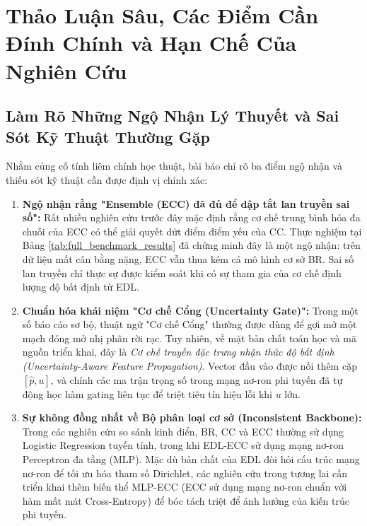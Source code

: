 \documentclass[1p,times]{elsarticle}
\begin{document}
\section{Thảo Luận Sâu, Các Điểm Cần Đính Chính và Hạn Chế Của Nghiên Cứu}
\label{sec:discussion}

\subsection{Làm Rõ Những Ngộ Nhận Lý Thuyết và Sai Sót Kỹ Thuật Thường Gặp}
Nhằm củng cố tính liêm chính học thuật, bài báo chỉ rõ ba điểm ngộ nhận và thiếu sót kỹ thuật cần được định vị chính xác:
\begin{enumerate}
    \item \textbf{Ngộ nhận rằng "Ensemble (ECC) đã đủ để dập tắt lan truyền sai số":} Rất nhiều nghiên cứu trước đây mặc định rằng cơ chế trung bình hóa đa chuỗi của ECC có thể giải quyết dứt điểm điểm yếu của CC. Thực nghiệm tại Bảng \ref{tab:full_benchmark_results} đã chứng minh đây là một ngộ nhận: trên dữ liệu mất cân bằng nặng, ECC vẫn thua kém cả mô hình cơ sở BR. Sai số lan truyền chỉ thực sự được kiểm soát khi có sự tham gia của cơ chế định lượng độ bất định từ EDL.
    \item \textbf{Chuẩn hóa khái niệm "Cơ chế Cổng (Uncertainty Gate)":} Trong một số báo cáo sơ bộ, thuật ngữ "Cơ chế Cổng" thường được dùng để gợi mở một mạch đóng mở nhị phân rời rạc. Tuy nhiên, về mặt bản chất toán học và mã nguồn triển khai, đây là \textit{Cơ chế truyền đặc trưng nhận thức độ bất định (Uncertainty-Aware Feature Propagation)}. Vector đầu vào được nối thêm cặp $[\hat{p}, u]$, và chính các ma trận trọng số trong mạng nơ-ron phi tuyến đã tự động học hàm gating liên tục để triệt tiêu tín hiệu lỗi khi $u$ lớn.
    \item \textbf{Sự không đồng nhất về Bộ phân loại cơ sở (Inconsistent Backbone):} Trong các nghiên cứu so sánh kinh điển, BR, CC và ECC thường sử dụng Logistic Regression tuyến tính, trong khi EDL-ECC sử dụng mạng nơ-ron Perceptron đa tầng (MLP). Mặc dù bản chất của EDL đòi hỏi cấu trúc mạng nơ-ron để tối ưu hóa tham số Dirichlet, các nghiên cứu trong tương lai cần triển khai thêm biến thể MLP-ECC (ECC sử dụng mạng nơ-ron chuẩn với hàm mất mát Cross-Entropy) để bóc tách triệt để ảnh hưởng của kiến trúc phi tuyến.
\end{enumerate}
\end{document}

